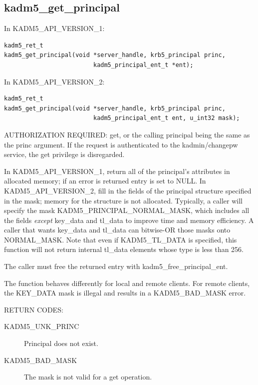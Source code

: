 \subsection{kadm5_get_principal}

In KADM5_API_VERSION_1:

\begin{verbatim}
kadm5_ret_t
kadm5_get_principal(void *server_handle, krb5_principal princ,
                         kadm5_principal_ent_t *ent);
\end{verbatim}

In KADM5_API_VERSION_2:

\begin{verbatim}
kadm5_ret_t
kadm5_get_principal(void *server_handle, krb5_principal princ,
                         kadm5_principal_ent_t ent, u_int32 mask);
\end{verbatim}

AUTHORIZATION REQUIRED: get, or the calling principal being the same
as the princ argument.  If the request is authenticated to the
kadmin/changepw service, the get privilege is disregarded.

In KADM5_API_VERSION_1, return all of the principal's attributes in
allocated memory; if an error is returned entry is set to NULL.  In
KADM5_API_VERSION_2, fill in the fields of the principal structure
specified in the mask; memory for the structure is not allocated.
Typically, a caller will specify the mask KADM5_PRINCIPAL_NORMAL_MASK,
which includes all the fields {\it except} key_data and tl_data to
improve time and memory efficiency.  A caller that wants key_data and
tl_data can bitwise-OR those masks onto NORMAL_MASK.  Note that even
if KADM5_TL_DATA is specified, this function will not return internal
tl_data elements whose type is less than 256.

The caller must free the returned entry with kadm5_free_principal_ent.

The function behaves differently for local and remote clients.  For
remote clients, the KEY_DATA mask is illegal and results in a
KADM5_BAD_MASK error.

RETURN CODES:

\begin{description}
\item[KADM5_UNK_PRINC] Principal does not exist.
\item[KADM5_BAD_MASK] The mask is not valid for a get operation.

\end{description}

